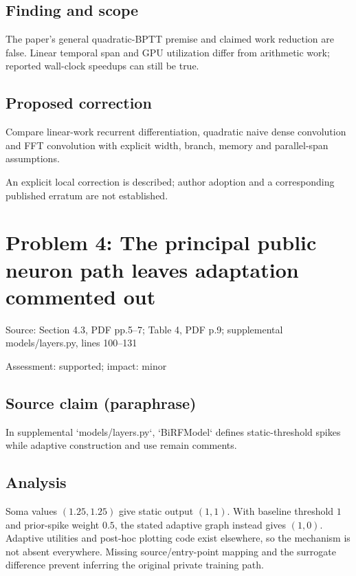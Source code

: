 \documentclass[11pt]{article}
\begin{document}
\subsection*{Finding and scope}

The paper’s general quadratic-BPTT premise and claimed work reduction are false. Linear temporal span and GPU utilization differ from arithmetic work; reported wall-clock speedups can still be true.

\subsection*{Proposed correction}

Compare linear-work recurrent differentiation, quadratic naive dense convolution and FFT convolution with explicit width, branch, memory and parallel-span assumptions.

An explicit local correction is described; author adoption and a corresponding published erratum are not established.

\section*{Problem 4: The principal public neuron path leaves adaptation commented out}

Source: Section 4.3, PDF pp.5–7; Table 4, PDF p.9; supplemental models/layers.py, lines 100–131

Assessment: supported; impact: minor

\subsection*{Source claim (paraphrase)}

In supplemental `models/layers.py`, `BiRFModel` defines static-threshold spikes while adaptive construction and use remain comments.

\subsection*{Analysis}

Soma values \((1.25,1.25)\) give static output \((1,1)\). With baseline threshold \(1\) and prior-spike weight \(0.5\), the stated adaptive graph instead gives \((1,0)\). Adaptive utilities and post-hoc plotting code exist elsewhere, so the mechanism is not absent everywhere. Missing source/entry-point mapping and the surrogate difference prevent inferring the original private training path.
\end{document}
